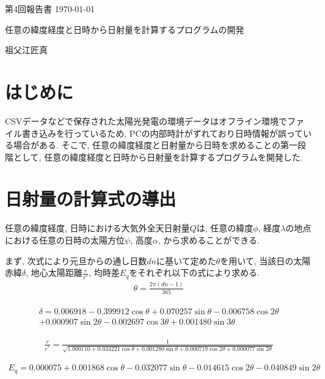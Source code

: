 \documentclass[a4j,12pt,]{jarticle}
\begin{document}
{\noindent\small 第4回報告書 \hfill\today}
\begin{center}
  {\Large 任意の緯度経度と日時から日射量を計算するプログラムの開発}
\end{center}
\begin{flushright}
  祖父江匠真 \\
\end{flushright}

\section{はじめに}
CSVデータなどで保存された太陽光発電の環境データはオフライン環境でファイル書き込みを行っているため, PCの内部時計がずれており日時情報が誤っている場合がある.
そこで, 任意の緯度経度と日射量から日時を求めることの第一段階として, 任意の緯度経度と日時から日射量を計算するプログラムを開発した.

\section{日射量の計算式の導出}
任意の緯度経度, 日時における大気外全天日射量$Q$は, 任意の緯度$\phi$, 経度$\lambda$の地点における任意の日時の太陽方位$\psi$, 高度$\alpha$, から求めることができる.

まず, 次式により元旦からの通し日数$dn$に基いて定めた$\theta$を用いて, 当該日の太陽赤緯$\delta$, 地心太陽距離$\frac{r}{r^{*}}$, 均時差$E_q$をそれぞれ以下の式により求める.
\begin{eqnarray}
  \theta =  \frac{2\pi (dn-1)}{365}
\end{eqnarray}

\begin{eqnarray}
\begin{split}
  \delta =  0.006918-0.399912\cos \theta+0.070257\sin \theta-0.006758\cos 2\theta\\
  +0.000907\sin 2\theta-0.002697\cos 3\theta+0.001480\sin 3\theta
\end{split}
\end{eqnarray}

\begin{eqnarray}
  \frac{r}{r^{*}} =  \frac{1}{\sqrt{1.000110+0.034221\cos \theta+0.001280\sin \theta+0.000719\cos 2\theta+0.000077\sin 2\theta}}
\end{eqnarray}

\begin{eqnarray}
  E_q =  0.000075+0.001868\cos \theta-0.032077\sin \theta-0.014615\cos 2\theta-0.040849\sin 2\theta
\end{eqnarray}
\end{document}
